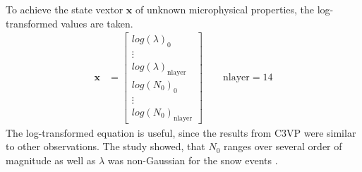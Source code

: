 To achieve the state vextor $\mathbf{x}$ of unknown microphysical properties, the log-transformed values are taken.
\begin{align}
\mathbf{x} & = \begin{bmatrix}
log(\lambda)_0 	\\
\vdots 			\\
log(\lambda)_{\text{nlayer}} 	\\
log(N_0)_0		\\
\vdots			\\
log(N_0)_{\text{nlayer}}		
\end{bmatrix} \qquad \text{nlayer} = 14
\label{eq:snow_prop}
\end{align}
The log-transformed equation is useful, since the results from C3VP were similar to other observations. The study showed, that $N_0$ ranges over several order of magnitude as well as $\lambda$ was non-Gaussian for the snow events \cite{wood_estimation_2011}.



